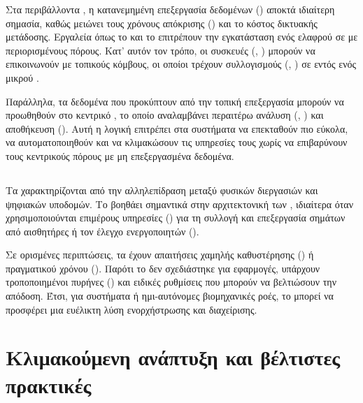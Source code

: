 Στα περιβάλλοντα , η κατανεμημένη επεξεργασία δεδομένων () αποκτά ιδιαίτερη σημασία, καθώς μειώνει τους χρόνους απόκρισης () και το κόστος δικτυακής μετάδοσης. Εργαλεία όπως το  και το  επιτρέπουν την εγκατάσταση ενός ελαφρού   σε  με περιορισμένους πόρους. Κατ’ αυτόν τον τρόπο, οι  συσκευές (, ) μπορούν να επικοινωνούν με τοπικούς κόμβους, οι οποίοι τρέχουν συλλογισμούς (, ) σε  εντός ενός μικρού  .

Παράλληλα, τα δεδομένα που προκύπτουν από την τοπική επεξεργασία μπορούν να προωθηθούν στο κεντρικό   , το οποίο αναλαμβάνει περαιτέρω ανάλυση (, ) και αποθήκευση (). Αυτή η λογική  επιτρέπει στα  συστήματα να επεκταθούν πιο εύκολα, να αυτοματοποιηθούν και να κλιμακώσουν τις υπηρεσίες τους χωρίς να επιβαρύνουν τους κεντρικούς πόρους με μη επεξεργασμένα δεδομένα.

\subsection{}

Τα  χαρακτηρίζονται από την αλληλεπίδραση μεταξύ φυσικών διεργασιών και ψηφιακών υποδομών. Το  βοηθάει σημαντικά στην αρχιτεκτονική των , ιδιαίτερα όταν χρησιμοποιούνται επιμέρους υπηρεσίες () για τη συλλογή και επεξεργασία σημάτων από αισθητήρες ή τον έλεγχο ενεργοποιητών ().

Σε ορισμένες περιπτώσεις, τα  έχουν απαιτήσεις χαμηλής καθυστέρησης () ή πραγματικού χρόνου (). Παρότι το  δεν σχεδιάστηκε για  εφαρμογές, υπάρχουν τροποποιημένοι πυρήνες  () και ειδικές ρυθμίσεις  που μπορούν να βελτιώσουν την απόδοση. Έτσι, για συστήματα  ή ημι-αυτόνομες βιομηχανικές ροές, το  μπορεί να προσφέρει μια ευέλικτη λύση ενορχήστρωσης και διαχείρισης.

\section{Κλιμακούμενη ανάπτυξη και βέλτιστες πρακτικές}

